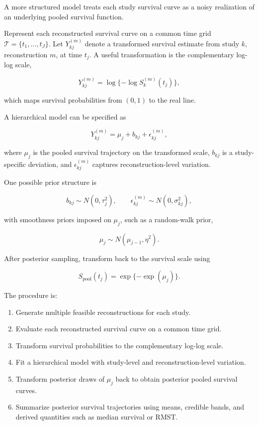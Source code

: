 \documentclass[11pt]{article}
\begin{document}
A more structured model treats each study survival curve as a noisy realization of an underlying pooled survival function.

Represent each reconstructed survival curve on a common time grid \(\mathcal T=\{t_1,\ldots,t_J\}\). Let \(Y_{kj}^{(m)}\) denote a transformed survival estimate from study \(k\), reconstruction \(m\), at time \(t_j\). A useful transformation is the complementary log-log scale,

\[Y_{kj}^{(m)}=\log\{-\log S_k^{(m)}(t_j)\},\]

which maps survival probabilities from \((0,1)\) to the real line.

A hierarchical model can be specified as

\[Y_{kj}^{(m)}=\mu_j+b_{kj}+\epsilon_{kj}^{(m)},\]

where \(\mu_j\) is the pooled survival trajectory on the transformed scale, \(b_{kj}\) is a study-specific deviation, and \(\epsilon_{kj}^{(m)}\) captures reconstruction-level variation.

One possible prior structure is

\[b_{kj}\sim N(0,\tau_j^2),\qquad \epsilon_{kj}^{(m)}\sim N(0,\sigma_{kj}^2),\]

with smoothness priors imposed on \(\mu_j\), such as a random-walk prior,

\[\mu_j\sim N(\mu_{j-1},\eta^2).\]

After posterior sampling, transform back to the survival scale using

\[S_{\text{pool}}(t_j)=\exp\{-\exp(\mu_j)\}.\]

The procedure is:

\begin{enumerate}
\item Generate multiple feasible reconstructions for each study.
\item Evaluate each reconstructed survival curve on a common time grid.
\item Transform survival probabilities to the complementary log-log scale.
\item Fit a hierarchical model with study-level and reconstruction-level variation.
\item Transform posterior draws of \(\mu_j\) back to obtain posterior pooled survival curves.
\item Summarize posterior survival trajectories using means, credible bands, and derived quantities such as median survival or RMST.
\end{enumerate}
\end{document}
